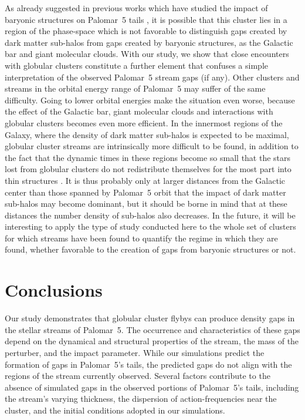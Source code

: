 \documentclass[draft]{aa}
\begin{document}
  As already suggested in previous works which have studied the impact of baryonic structures on Palomar~5 tails \citep{2017NatAs...1..633P, 2019MNRAS.484.2009B}, it is possible that this cluster lies in a region of the phase-space which is not favorable to distinguish gaps created by dark matter sub-halos from gaps created by baryonic structures, as the Galactic bar and giant molecular clouds. With our study, we show that close encounters with globular clusters constitute a further element that confuses a simple interpretation of the observed Palomar~5 stream gaps (if any). Other clusters and streams in the orbital energy range of Palomar~5 may suffer of the same difficulty. Going to lower orbital energies make the situation even worse, because the effect of the Galactic bar, giant molecular clouds and interactions with globular clusters becomes even more efficient. In the innermost regions of the Galaxy, where the density of dark matter sub-halos is expected to be maximal, globular cluster streams are intrinsically more difficult to be found, in addition to the fact that the dynamic times in these regions become so small that the stars lost from globular clusters do not redistribute themselves for the most part into thin structures \citep[see][]{2023A&A...673A..44F}. It is thus probably only at larger distances from the Galactic center than those spanned by Palomar~5 orbit that the impact of dark matter sub-halos may become dominant, but it should be borne in mind that at these distances the number density of sub-halos also decreases. In the future, it will be interesting to apply the type of study conducted here to the whole set of clusters for which streams have been found to quantify the regime in which they are found, whether favorable to the creation of gaps from baryonic structures or not.
  

  
\section{Conclusions}
  Our study demonstrates that globular cluster flybys can produce density gaps in the stellar streams of Palomar~5. The occurrence and characteristics of these gaps depend on the dynamical and structural properties of the stream, the mass of the perturber, and the impact parameter. While our simulations predict the formation of gaps in Palomar~5's tails, the predicted gaps do not align with the regions of the stream currently observed. Several factors contribute to the absence of simulated gaps in the observed portions of Palomar~5's tails, including the stream's varying thickness, the dispersion of action-frequencies near the cluster, and the initial conditions adopted in our simulations. 
\end{document}
